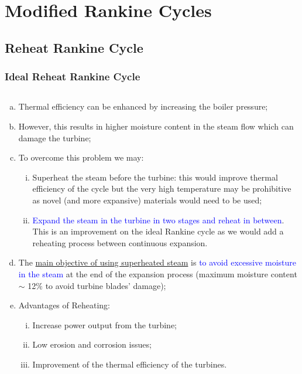 \documentclass[10pt,compress]{beamer}
\newcommand{\blue}{\textcolor{blue}}
\begin{document}
\section{Modified Rankine Cycles}

\subsection{Reheat Rankine Cycle}

\begin{frame}
 \frametitle{Ideal Reheat Rankine Cycle}
  \begin{columns}
     \begin{column}[c]{0.5\linewidth}
        \begin{enumerate}[(a)] \scriptsize
           \item<1-> Thermal efficiency can be enhanced by increasing the boiler pressure;
           \item<1-> However, this results in higher moisture content in the steam flow which can damage the turbine;
           \item<2-> To overcome this problem we may:
           \begin{enumerate}[(i)] \scriptsize
             \item<2-> Superheat the steam before the turbine: this would improve thermal efficiency of the cycle but the very high temperature may be prohibitive as novel (and more expansive) materials would need to be used;
             \item<2-> \blue{Expand the steam in the turbine in two stages and reheat in between}. This is an improvement on the ideal Rankine cycle as we would add a reheating process between continuous expansion.
           \end{enumerate}
           \item<3-> The \underline{main objective of using superheated steam} is \blue{to avoid excessive moisture in the steam} at the end of the expansion process (maximum moisture content $\sim$ 12$\%$ to avoid turbine blades' damage);
           \item<4-> Advantages of Reheating:
              \begin{enumerate}[(i)]\scriptsize
                 \item<4-> Increase power output from the turbine;
                 \item<4-> Low erosion and corrosion issues;
                 \item<4-> Improvement of the thermal efficiency of the turbines.

\end{enumerate}
\end{enumerate}
\end{column}
\end{columns}
\end{frame}
\end{document}
